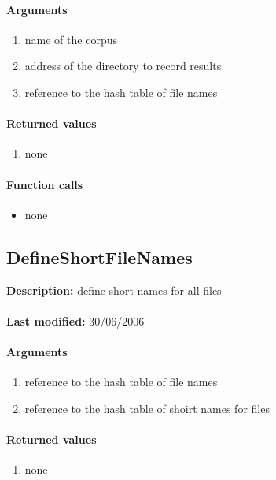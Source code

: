 \paragraph{Arguments}
\begin{enumerate}
\item name of the corpus
\item address of the directory to record results
\item reference to the hash table of file names
\end{enumerate}

\paragraph{Returned values}
\begin{enumerate}
\item none
\end{enumerate}

\paragraph{Function calls}
\begin{itemize}
\item none
\end{itemize}

\subsection{DefineShortFileNames}
\textbf{Description:} define short names for all files\\
\\\textbf{Last modified:} 30/06/2006

\paragraph{Arguments}
\begin{enumerate}
\item reference to the hash table of file names
\item reference to the hash table of shoirt names for files
\end{enumerate}

\paragraph{Returned values}
\begin{enumerate}
\item none
\end{enumerate}

